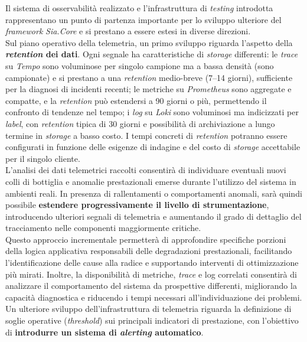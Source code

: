 Il sistema di osservabilità realizzato e l'infrastruttura di \emph{testing}
introdotta rappresentano un punto di partenza importante per lo sviluppo
ulteriore del \emph{framework} \emph{Sia.Core} e si prestano a essere estesi in
diverse direzioni.\\
Sul piano operativo della telemetria, un primo sviluppo riguarda l'aspetto
della \textbf{\emph{retention} dei dati}. Ogni segnale ha caratteristiche di
\emph{storage} differenti: le \emph{trace} su \emph{Tempo} sono voluminose per
singolo campione ma a bassa densità (sono campionate) e si prestano a una
\emph{retention} medio-breve (7--14 giorni), sufficiente per la diagnosi di
incidenti recenti; le metriche su \emph{Prometheus} sono aggregate e
compatte, e la \emph{retention} può estendersi a 90 giorni o più, permettendo
il confronto di tendenze nel tempo; i \emph{log} su \emph{Loki} sono voluminosi
ma indicizzati per \emph{label}, con \emph{retention} tipica di 30 giorni e
possibilità di archiviazione a lungo termine in \emph{storage} a basso costo. I
tempi concreti di \emph{retention} potranno essere configurati in funzione delle
esigenze di indagine e del costo di \emph{storage} accettabile per il singolo
cliente.\\
L'analisi dei dati telemetrici raccolti consentirà di individuare eventuali
nuovi colli di bottiglia e anomalie prestazionali emerse durante l'utilizzo
del sistema in ambienti reali. In presenza di rallentamenti o comportamenti
anomali, sarà quindi possibile \textbf{estendere progressivamente il livello di
      strumentazione}, introducendo ulteriori segnali di telemetria e aumentando
il grado di dettaglio del tracciamento nelle componenti maggiormente critiche.\\
Questo approccio incrementale permetterà di approfondire specifiche porzioni della
logica applicativa responsabili delle degradazioni prestazionali, facilitando
l'identificazione delle cause alla radice e supportando interventi di ottimizzazione
più mirati. Inoltre, la disponibilità di metriche, \emph{trace} e log correlati
consentirà di analizzare il comportamento del sistema da prospettive differenti,
migliorando la capacità diagnostica e riducendo i tempi necessari all'individuazione
dei problemi.\\
Un ulteriore sviluppo dell'infrastruttura di telemetria riguarda la definizione
di soglie operative (\emph{threshold}) sui principali indicatori di prestazione,
con l'obiettivo di \textbf{introdurre un sistema di \emph{alerting} automatico}.\\
